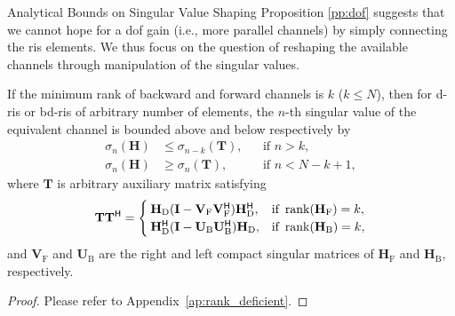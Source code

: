 \begin{section}{Analytical Bounds on Singular Value Shaping}
	Proposition \ref{pp:dof} suggests that we cannot hope for a \gls{dof} gain (i.e., more parallel channels) by simply connecting the \gls{ris} elements.
	We thus focus on the question of reshaping the available channels through manipulation of the singular values.


	\begin{proposition}\label{pp:rank_deficient}
		If the minimum rank of backward and forward channels is $k$ ($k \le N$),
		then for \gls{d}-\gls{ris} or \gls{bd}-\gls{ris} of arbitrary number of elements, the $n$-th singular value of the equivalent channel is bounded above and below respectively by
		\begin{subequations}
			\begin{align}
				\sigma_n(\mathbf{H}) & \le \sigma_{n-k}(\mathbf{T}), &  & \text{if } n > k, \label{iq:sv_bound_enlarge}          \\
				\sigma_n(\mathbf{H}) & \ge \sigma_n(\mathbf{T}),     &  & \text{if } n < N - k + 1, \label{iq:sv_bound_suppress}
			\end{align}
			\label{iq:sv_bound_rank_deficient}
		\end{subequations}
		where $\mathbf{T}$ is arbitrary auxiliary matrix satisfying
		\begin{equation}
			\mathbf{T} \mathbf{T}^\mathsf{H} =
			\begin{cases}
				\mathbf{H}_\mathrm{D} (\mathbf{I} - \mathbf{V}_\mathrm{F} \mathbf{V}_\mathrm{F}^\mathsf{H}) \mathbf{H}_\mathrm{D}^\mathsf{H}, & \text{if } \operatorname{rank}(\mathbf{H}_\mathrm{F}) = k, \\
				\mathbf{H}_\mathrm{D}^\mathsf{H} (\mathbf{I} - \mathbf{U}_\mathrm{B} \mathbf{U}_\mathrm{B}^\mathsf{H}) \mathbf{H}_\mathrm{D}, & \text{if } \operatorname{rank}(\mathbf{H}_\mathrm{B}) = k,
			\end{cases}
			\label{eq:auxiliary_matrix}
		\end{equation}
		and $\mathbf{V}_\mathrm{F}$ and $\mathbf{U}_\mathrm{B}$ are the right and left compact singular matrices of $\mathbf{H}_\mathrm{F}$ and $\mathbf{H}_\mathrm{B}$, respectively.
	\end{proposition}
	\begin{proof}
		Please refer to Appendix~\ref{ap:rank_deficient}.
	\end{proof}


\end{section}
